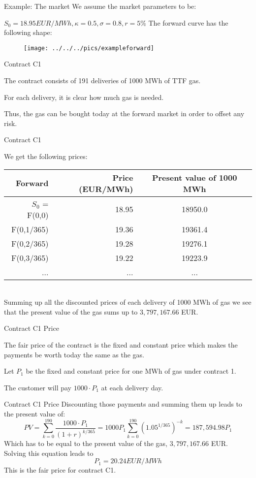 {Example: The market}
We assume the market parameters to be:
\item $S_0 = 18.95 EUR/MWh, \kappa = 0.5, \sigma = 0.8, r= 5\%$
The forward curve has the following shape:
\begin{figure}
	\centering
		\texttt{[image: ../../../pics/exampleforward]}
	\label{fig:exampleforward}
\end{figure}

{Contract C1}
\item<1-> The contract consists of 191 deliveries of 1000 MWh of TTF gas.
\item<2-> For each delivery, it is clear how much gas is needed.
\item<3-> Thus, the gas can be bought today at the forward market in order to offset any risk.

{Contract C1}

We get the following prices:
\begin{tabular}{rrc}
   Forward &      Price (EUR/MWh)& Present value of 1000 MWh \\
\hline
$S_0$ = F(0,0) &         18.95 &      18950.0 \\

 F(0,1/365) &    19.36 &    19361.4 \\

 F(0,2/365) &    19.28 &    19276.1 \\

 F(0,3/365) &    19.22 &    19223.9 \\
...&...&...\\
\end{tabular}  \\
Summing up all the discounted prices of each delivery of 1000 MWh of gas we see that the present value of the gas sums up to $3,797,167.66$ EUR.

{Contract C1 Price}
\item<1-> The fair price of the contract is the fixed and constant price which makes the payments be worth today the same as the gas.
\item<2-> Let $P_1$ be the fixed and constant price for one MWh of gas under contract 1.
\item<3-> The customer will pay $1000 \cdot P_1$ at each delivery day.

{Contract C1 Price}
Discounting those payments and summing them up leads to the present value of:
$$
	PV = \sum_{k=0}^{190}{\frac{1000 \cdot P_1}{(1 + r)^{k/365}}} = 1000 P_1 \sum_{k=0}^{190} (1.05^{1/365})^{-k} = 187,594.98 P_1
$$
Which has to be equal to the present value of the gas, $3,797,167.66$ EUR. Solving this equation leads to
$$
	P_1 = 20.24 EUR/MWh
$$
This is the fair price for contract C1.

